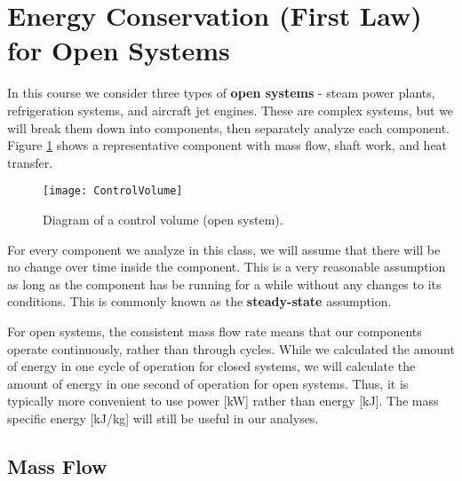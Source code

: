 \section{Energy Conservation (First Law) for Open Systems}
In this course we consider three types of {\bf open systems} - steam power plants, refrigeration systems, and aircraft jet engines. These are complex systems, but we will break them down into components, then separately analyze each component. Figure \ref{fig:ch4_controlVolume} shows a representative component with mass flow, shaft work, and heat transfer.

\begin{figure}[H]
\centering
\texttt{[image: ControlVolume]}
\caption{Diagram of a control volume (open system).}
\label{fig:ch4_controlVolume}
\end{figure}

For every component we analyze in this class, we will assume that there will be no change over time inside the component.  This is a very reasonable assumption as long as the component has be running for a while without any changes to its conditions.  This is commonly known as the {\bf steady-state} assumption.

For open systems, the consistent mass flow rate means that our components operate continuously, rather than through cycles.  While we calculated the amount of energy in one cycle of operation for closed systems, we will calculate the amount of energy in one second of operation for open systems.  Thus, it is typically more convenient to use power [kW] rather than energy [kJ].  The mass specific energy [kJ/kg] will still be useful in our analyses.

\subsection{Mass Flow}



